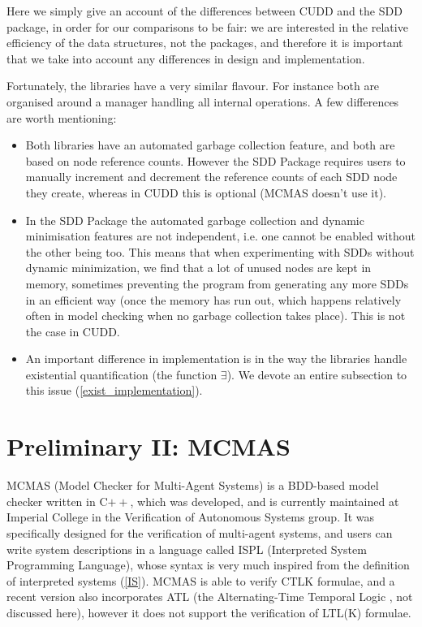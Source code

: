 \documentclass[11pt]{report}
\begin{document}
Here we simply give an account of the differences between  CUDD and the SDD package, in order for our comparisons to be fair: we are interested in the relative efficiency of the data structures, not the packages, and therefore it is important that we take into account any differences in design and implementation. 

Fortunately, the libraries have a very similar flavour. For instance both are organised around a manager handling all internal operations. A few differences are worth mentioning:
\begin{itemize}
\item Both libraries have an automated garbage collection feature, and both are based on node reference counts. However the SDD Package requires users to manually increment and decrement the reference counts of each SDD node they create, whereas in CUDD this is optional (MCMAS doesn't use it). 
\item In the SDD Package the automated garbage collection and dynamic minimisation features are not independent, i.e. one cannot be enabled without the other being too. This means that when experimenting with SDDs without dynamic minimization, we find that a lot of unused nodes are kept in memory, sometimes preventing the program from generating any more SDDs in an efficient way (once the memory has run out, which happens relatively often in model checking when no garbage collection takes place). This is not the case in CUDD. 
\item An important difference in implementation is in the way the libraries handle existential quantification (the function $\exists$). We devote an entire subsection to this issue (\ref{exist_implementation}).

\end{itemize}
\label{gc}

\section{Preliminary II: MCMAS} 


MCMAS (Model Checker for Multi-Agent Systems) is a BDD-based model checker written in C$++$, which was developed, and is currently maintained at Imperial College in the Verification of Autonomous Systems group. It was specifically designed for the verification of multi-agent systems, and users can write system descriptions in a language called ISPL (Interpreted System Programming Language), whose syntax is very much inspired from the definition of interpreted systems (\ref{IS}). MCMAS is able to verify CTLK formulae, and a recent version also incorporates ATL (the Alternating-Time Temporal Logic \cite{atl}, not discussed here), however it does not support the verification of LTL(K) formulae.
\end{document}
